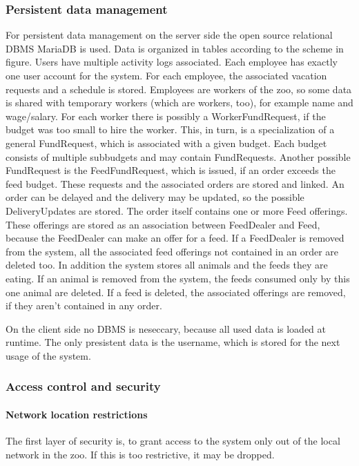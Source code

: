 		\subsubsection{Persistent data management}
			For persistent data management on the server side the open source relational DBMS MariaDB is used. Data is organized in tables according to the scheme in figure. Users have multiple activity logs associated. Each employee has exactly one user account for the system. For each employee, the associated vacation requests and a schedule is stored. Employees are workers of the zoo, so some data is shared with temporary workers (which are workers, too), for example name and wage/salary. For each worker there is possibly a WorkerFundRequest, if the budget was too small to hire the worker. This, in turn, is a specialization of a general FundRequest, which is associated with a given budget. Each budget consists of multiple subbudgets and may contain FundRequests. Another possible FundRequest is the FeedFundRequest, which is issued, if an order exceeds the feed budget. These requests and the associated orders are stored and linked. An order can be delayed and the delivery may be updated, so the possible DeliveryUpdates are stored. The order itself contains one or more Feed offerings. These offerings are stored as an association between FeedDealer and Feed, because the FeedDealer can make an offer for a feed. If a FeedDealer is removed from the system, all the associated feed offerings not contained in an order are deleted too. In addition the system stores all animals and the feeds they are eating. If an animal is removed from the system, the feeds consumed only by this one animal are deleted. If a feed is deleted, the associated offerings are removed, if they aren't contained in any order.


			On the client side no DBMS is neseccary, because all used data is loaded at runtime. The only presistent data is the username, which is stored for the next usage of the system.
		\subsubsection{Access control and security}
			\paragraph{Network location restrictions}
				The first layer of security is, to grant access to the system only out of the local network in the zoo. If this is too restrictive, it may be dropped.
